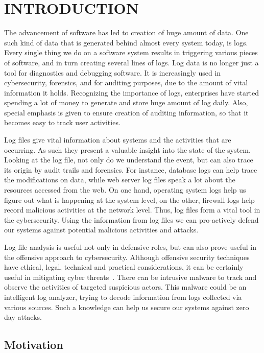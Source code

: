 \chapter{INTRODUCTION}
\thispagestyle{plain}

\label{Introduction}

The advancement of software has led to creation of huge amount of data. One such kind of data that is generated behind almost every system today, is logs. Every single thing we do on a software system results in triggering various pieces of software, and in turn creating several lines of logs. Log data is no longer just a tool for diagnostics and debugging software. It is increasingly used in cybersecurity, forensics, and for auditing purposes, due to the amount of vital information it holds. Recognizing the importance of logs, enterprises have started spending a lot of money to generate and store huge amount of log daily. Also, special emphasis is given to ensure creation of auditing information, so that it becomes easy to track user activities.

Log files give vital information about systems and the activities that are occurring. As such they present a valuable insight into the state of the system. Looking at the log file, not only do we understand the event, but can also trace its origin by audit trails and forensics. For instance, database logs can help trace the modifications on data, while web server log files speak a lot about the resources accessed from the web. On one hand, operating system logs help us figure out what is happening at the system level, on the other, firewall logs help record malicious activities at the network level. Thus, log files form a vital tool in the cybersecurity. Using the information from log files we can pro-actively defend our systems against potential malicious activities and attacks.

Log file analysis is useful not only in defensive roles, but can also prove useful in the offensive approach to cybersecurity. Although offensive security techniques have ethical, legal, technical and practical considerations, it can be certainly useful in mitigating cyber threats~\cite{offensive_cybersecurity}. There can be intrusive malware to track and observe the activities of targeted suspicious actors. This malware could be an intelligent log analyzer, trying to decode information from logs collected via various sources. Such a knowledge can help us secure our systems against zero day attacks.


\section{Motivation}

